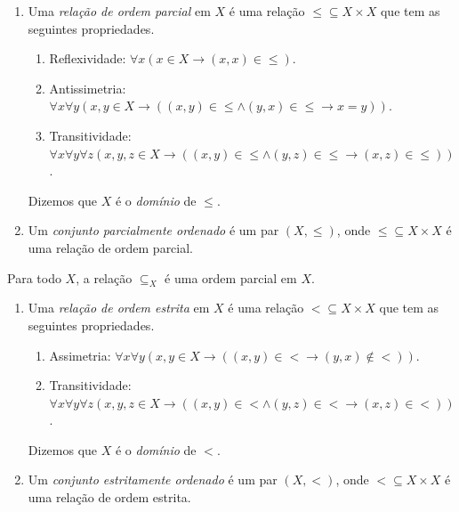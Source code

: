 \begin{definition} \label{defi.set:ordemparcial}
    \leavevmode
        \begin{enumerate}[leftmargin=*, align=left, label=\textbf{(\alph*)}]
            \item Uma \emph{relação de ordem parcial} em $X$ é uma relação ${\leq} \subseteq X \times X$ que tem as seguintes propriedades.
                \begin{enumerate}[label=\roman*.]
                    \item Reflexividade: $\forall x(x \in X \rightarrow (x,x) \in {\leq})$.
                    \item Antissimetria: $\forall x \forall y (x,y \in X \rightarrow ((x,y) \in {\leq} \land (y,x) \in {\leq} \rightarrow x=y))$.
                    \item Transitividade: $\forall x \forall y \forall z (x,y,z \in X \rightarrow ((x,y) \in {\leq} \land (y,z) \in {\leq} \rightarrow (x,z) \in {\leq}))$. 
                \end{enumerate}
            Dizemos que $X$ é o \emph{domínio} de $\leq$.
            \item Um \emph{conjunto parcialmente ordenado} é um par $(X, \leq)$, onde ${\leq} \subseteq X \times X$ é uma relação de ordem parcial.
        \end{enumerate}
\end{definition}

\begin{example}
    Para todo $X$, a relação $\subseteq_X$ é uma ordem parcial em $X$.
\end{example}

\begin{definition} \label{defi.set:ordemestrita}
    \leavevmode
        \begin{enumerate}[leftmargin=*, align=left, label=\textbf{(\alph*)}]
            \item Uma \emph{relação de ordem estrita} em $X$ é uma relação ${<} \subseteq X \times X$ que tem as seguintes propriedades.
                \begin{enumerate}[label=\roman*.]
                    \item Assimetria: $\forall x \forall y (x,y \in X \rightarrow ((x,y) \in {<} \rightarrow (y,x) \notin {<}))$.
                    \item Transitividade: $\forall x \forall y \forall z (x,y,z \in X \rightarrow ( (x, y) \in {<} \land (y, z) \in {<} \rightarrow (x,z) \in {<}))$. 
                \end{enumerate}
            Dizemos que $X$ é o \emph{domínio} de $<$.
            \item Um \emph{conjunto estritamente ordenado} é um par $(X, <)$, onde ${<} \subseteq X \times X$ é uma relação de ordem estrita.
        \end{enumerate}
\end{definition}

